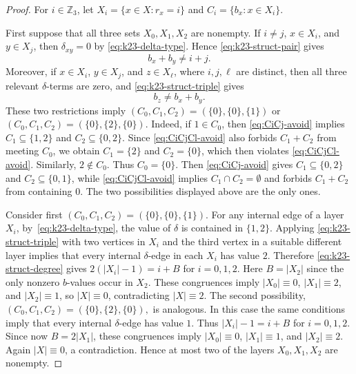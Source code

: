 ﻿\documentclass[11pt]{article}
\numberwithin{equation}{section}
\theoremstyle{remark}
\newcommand{\Z}{\mathbb Z}
\begin{document}
\begin{proof}
    For $i\in\Z_3$, let $X_i=\{x\in X:r_x=i\}$ and $C_i=\{b_x:x\in X_i\}$.

    First suppose that all three sets \(X_0,X_1,X_2\) are nonempty.
    If $i\ne j$, $x\in X_i$, and $y\in X_j$, then $\delta_{xy}=0$ by \eqref{eq:k23-delta-type}. Hence \eqref{eq:k23-struct-pair} gives
    \begin{equation}\label{eq:CiCj-avoid}
        b_x+b_y\ne i+j.
    \end{equation}
    Moreover, if \(x\in X_i\), \(y\in X_j\), and \(z\in X_\ell\), where \(i,j,\ell\) are distinct, then all three relevant \(\delta\)-terms are zero, and \eqref{eq:k23-struct-triple} gives
    \begin{equation}\label{eq:CiCjCl-avoid}
        b_z\ne b_x+b_y.
    \end{equation}
    These two restrictions imply $(C_0,C_1,C_2)=(\{0\},\{0\},\{1\})$ or $(C_0,C_1,C_2)=(\{0\},\{2\},\{0\})$.
    Indeed, if \(1\in C_0\), then \eqref{eq:CiCj-avoid} implies \(C_1\subseteq\{1,2\}\) and \(C_2\subseteq\{0,2\}\). Since \eqref{eq:CiCjCl-avoid} also forbids \(C_1+C_2\) from meeting \(C_0\), we obtain \(C_1=\{2\}\) and \(C_2=\{0\}\), which then violates \eqref{eq:CiCjCl-avoid}. Similarly, \(2\notin C_0\). Thus \(C_0=\{0\}\). Then \eqref{eq:CiCj-avoid} gives \(C_1\subseteq\{0,2\}\) and \(C_2\subseteq\{0,1\}\), while \eqref{eq:CiCjCl-avoid} implies \(C_1\cap C_2=\emptyset\) and forbids \(C_1+C_2\) from containing \(0\). The two possibilities displayed above are the only ones.

    Consider first
    \((C_0,C_1,C_2)=(\{0\},\{0\},\{1\}).\)
    For any internal edge of a layer \(X_i\), by~\eqref{eq:k23-delta-type}, the value of \(\delta\) is contained in \(\{1,2\}\). Applying \eqref{eq:k23-struct-triple} with two vertices in \(X_i\) and the third vertex in a suitable different layer implies that every internal \(\delta\)-edge in each \(X_i\) has value \(2\). Therefore \eqref{eq:k23-struct-degree} gives $2(|X_i|-1)=i+B$ for $i=0,1,2$. Here $B=|X_2|$ since the only nonzero \(b\)-values occur in \(X_2\).  These congruences imply $|X_0|\equiv0$, $|X_1|\equiv2$, and $|X_2|\equiv1$, so $|X|\equiv0$, contradicting $|X|\equiv2$.
    The second possibility,
    \((C_0,C_1,C_2)=(\{0\},\{2\},\{0\}),\)
    is analogous. In this case the same conditions imply that every internal \(\delta\)-edge has value \(1\). Thus $|X_i|-1=i+B$ for $i=0,1,2$. Since now \(B=2|X_1|\), these congruences imply $|X_0|\equiv0$, $|X_1|\equiv1$, and $|X_2|\equiv2$. Again \(|X|\equiv 0\), a contradiction. Hence at most two of the layers \(X_0,X_1,X_2\) are nonempty.


\end{proof}
\end{document}
